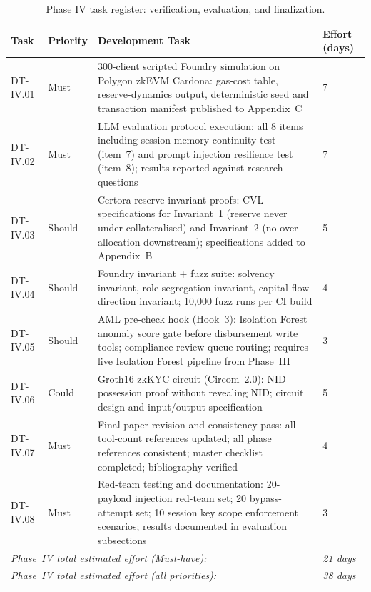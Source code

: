 \documentclass[12pt,a4paper]{report}
\begin{document}
\begin{table}[H]
\centering
\caption{Phase IV task register: verification, evaluation, and finalization.}
\label{tab:phaseIV}
\small
\begin{tabular}{p{1.8cm}p{1.8cm}p{7.5cm}p{1.5cm}}
\hline
\textbf{Task} & \textbf{Priority} & \textbf{Development Task} & \textbf{Effort (days)} \\
\hline
DT-IV.01 & Must & 300-client scripted Foundry simulation on Polygon zkEVM Cardona: gas-cost table, reserve-dynamics output, deterministic seed and transaction manifest published to Appendix~C & 7 \\
\hline
DT-IV.02 & Must & LLM evaluation protocol execution: all 8 items including session memory continuity test (item~7) and prompt injection resilience test (item~8); results reported against research questions & 7 \\
\hline
DT-IV.03 & Should & Certora reserve invariant proofs: CVL specifications for Invariant~1 (reserve never under-collateralised) and Invariant~2 (no over-allocation downstream); specifications added to Appendix~B & 5 \\
\hline
DT-IV.04 & Should & Foundry invariant + fuzz suite: solvency invariant, role segregation invariant, capital-flow direction invariant; 10{,}000 fuzz runs per CI build & 4 \\
\hline
DT-IV.05 & Should & AML pre-check hook (Hook~3): Isolation Forest anomaly score gate before disbursement write tools; compliance review queue routing; requires live Isolation Forest pipeline from Phase~III & 3 \\
\hline
DT-IV.06 & Could & Groth16 zkKYC circuit (Circom~2.0): NID possession proof without revealing NID; circuit design and input/output specification & 5 \\
\hline
DT-IV.07 & Must & Final paper revision and consistency pass: all tool-count references updated; all phase references consistent; master checklist completed; bibliography verified & 4 \\
\hline
DT-IV.08 & Must & Red-team testing and documentation: 20-payload injection red-team set; 20 bypass-attempt set; 10 session key scope enforcement scenarios; results documented in evaluation subsections & 3 \\
\hline
\multicolumn{3}{l}{\textit{Phase~IV total estimated effort (Must-have):}} & \textit{21 days} \\
\multicolumn{3}{l}{\textit{Phase~IV total estimated effort (all priorities):}} & \textit{38 days} \\
\hline
\end{tabular}
\end{table}
\end{document}
